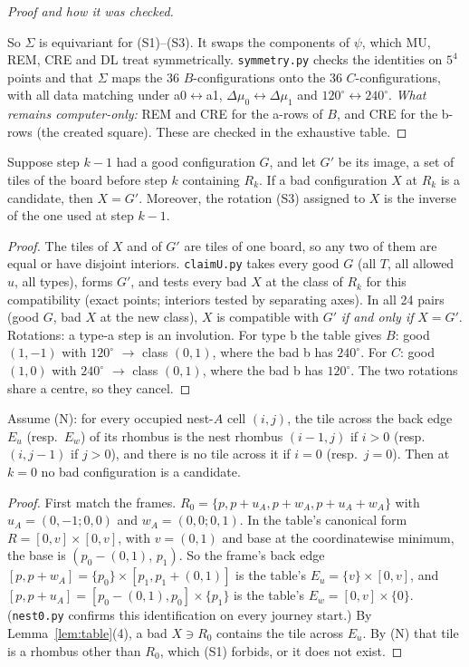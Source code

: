 \documentclass[11pt]{article}
\theoremstyle{definition}\newtheorem{definition}[theorem]{Definition}\newtheorem{remark}[theorem]{Remark}
\begin{document}
\begin{proof}[Proof and how it was checked]
\begin{itemize}
\end{itemize}
So $\Sigma$ is equivariant for (S1)--(S3). It swaps the components of $\psi$, which MU, REM, CRE and DL treat symmetrically. \texttt{symmetry.py} checks the identities on $5^4$ points and that $\Sigma$ maps the 36 $B$-configurations onto the 36 $C$-configurations, with all data matching under a0$\leftrightarrow$a1, $\Delta\mu_0\leftrightarrow\Delta\mu_1$ and $120^\circ\leftrightarrow240^\circ$.
\emph{What remains computer-only:} REM and CRE for the a-rows of $B$, and CRE for the b-rows (the created square). These are checked in the exhaustive table.
\end{proof}

\begin{lemma}\label{lem:undo}
Suppose step $k-1$ had a good configuration $G$, and let $G'$ be its image, a set of tiles of the board before step $k$ containing $R_k$. If a bad configuration $X$ at $R_k$ is a candidate, then $X=G'$. Moreover, the rotation (S3) assigned to $X$ is the inverse of the one used at step $k-1$.
\end{lemma}
\begin{proof}
The tiles of $X$ and of $G'$ are tiles of one board, so any two of them are equal or have disjoint interiors.
\texttt{claimU.py} takes every good $G$ (all $T$, all allowed $u$, all types), forms $G'$, and tests every bad $X$ at the class of $R_k$ for this compatibility (exact points; interiors tested by separating axes). In all 24 pairs (good $G$, bad $X$ at the new class), $X$ is compatible with $G'$ \emph{if and only if} $X=G'$.
Rotations: a type-a step is an involution. For type b the table gives $B$: good $(1,-1)$ with $120^\circ$ $\to$ class $(0,1)$, where the bad b has $240^\circ$. For $C$: good $(1,0)$ with $240^\circ$ $\to$ class $(0,1)$, where the bad b has $120^\circ$. The two rotations share a centre, so they cancel.
\end{proof}

\begin{lemma}\label{lem:start}
Assume (N): for every occupied nest-$A$ cell $(i,j)$, the tile across the back edge $E_u$ (resp.\ $E_w$) of its rhombus is the nest rhombus $(i-1,j)$ if $i>0$ (resp.\ $(i,j-1)$ if $j>0$), and there is no tile across it if $i=0$ (resp.\ $j=0$). Then at $k=0$ no bad configuration is a candidate.
\end{lemma}
\begin{proof}
First match the frames. $R_0=\{p,p+u_A,p+w_A,p+u_A+w_A\}$ with $u_A=(0,-1;0,0)$ and $w_A=(0,0;0,1)$. In the table's canonical form $R=[0,v]\times[0,v]$, with $v=(0,1)$ and base at the coordinatewise minimum, the base is $(p_0-(0,1),\,p_1)$.
So the frame's back edge $[p,p+w_A]=\{p_0\}\times[p_1,p_1+(0,1)]$ is the table's $E_u=\{v\}\times[0,v]$, and $[p,p+u_A]=[p_0-(0,1),p_0]\times\{p_1\}$ is the table's $E_w=[0,v]\times\{0\}$. (\texttt{nest0.py} confirms this identification on every journey start.)
By Lemma~\ref{lem:table}(4), a bad $X\ni R_0$ contains the tile across $E_u$. By (N) that tile is a rhombus other than $R_0$, which (S1) forbids, or it does not exist.
\end{proof}
\end{document}
